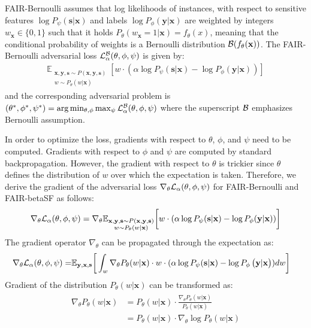 \documentclass[preprint,12pt]{elsarticle}
\begin{document}
FAIR-Bernoulli assumes that log likelihoods of instances, with respect to sensitive features $\log P_{\psi}(\mathbf{s}|\mathbf{x})$ and labels $\log P_{\phi}(\mathbf{y}|\mathbf{x})$ are weighted by integers $w_\mathbf{x} \in \{0,1\}$ such that it holds $P_\theta(w_\mathbf{x}=1|\mathbf{x})=f_\theta(x)$, meaning that the conditional probability of weights is a Bernoulli distribution ${\cal B}(f_\theta(\mathbf{x}))$. The FAIR-Bernoulli adversarial loss ${\cal L}^{\cal B}_{\alpha}(\theta, \phi, \psi)$ is given by:
\begin{gather}
\label{Eq:Loss_prob}
\mathbb{E}_{\substack{\mathbf{x},\mathbf{y}, \mathbf{s} \sim P\left(\mathbf{x},\mathbf{y}, \mathbf{s}\right)\\w \sim P_\theta(w|\mathbf{x})}}  \left[ w \cdot(\alpha\log P_{\psi}\left(\mathbf{s}|\mathbf{x}\right)
-  \log P_{\phi}\left(\mathbf{y}|\mathbf{x}\right))\right]
\end{gather}
and the corresponding adversarial problem is $(\theta^*,\phi^*,\psi^*) = \arg\min_{\theta,\phi}\max_{\psi}{\cal L}^{\cal B}_\alpha(\theta,\phi,\psi)$
where the superscript ${\cal B}$ emphasizes Bernoulli assumption.

In order to optimize the loss, gradients with respect to $\theta$, $\phi$, and $\psi$ need to be computed. Gradients with respect to $\phi$ and $\psi$ are computed by standard backpropagation. However, the gradient with respect to $\theta$ is trickier since $\theta$ defines the distribution of $w$ over which the expectation is taken. Therefore, we derive the gradient of the adversarial loss $\nabla_{\theta}{\cal L}_{\alpha}(\theta, \phi, \psi)$ for FAIR-Bernoulli and FAIR-betaSF as follows:
$$\nabla_{\theta}{\cal L}_{\alpha}(\theta, \phi, \psi) = \nabla_{\theta} \mathbb{E}_{\substack{\mathbf{x},\mathbf{y}, \mathbf{s} \sim P(\mathbf{x},\mathbf{y}, \mathbf{s})\\w \sim P_\theta(w|\mathbf{x})}} \bigg[ w \cdot ( \alpha \log P_{\psi}(\mathbf{s}|\mathbf{x}) - \log P_{\phi}(\mathbf{y}|\mathbf{x}))\bigg]$$
The gradient operator $\nabla_{\theta}$ can be propagated through the expectation as:
\begin{align*}
\begin{split}
\nabla_{\theta}{\cal L}_{\alpha}(\theta, \phi, \psi) =& \mathbb{E}_{\mathbf{y},\mathbf{x},\mathbf{s}} \bigg[ \int_w \nabla_{\theta}  P_\theta(w|\mathbf{x}) \cdot w \cdot ( \alpha \log P_{\psi}(\mathbf{s}|\mathbf{x}) - \log P_{\phi}\left(\mathbf{y}|\mathbf{x}\right))dw \bigg]
\end{split}
\end{align*}
Gradient of the distribution $P_\theta(w|\mathbf{x})$ can be transformed as:
\begin{align*}
\begin{split}
\nabla_{\theta}  P_\theta(w|\mathbf{x}) &= P_\theta(w|\mathbf{x}) \cdot \frac{\nabla_{\theta}P_\theta(w|\mathbf{x}) }{ P_\theta(w|\mathbf{x})}
\\
&= P_\theta(w|\mathbf{x}) \cdot \nabla_{\theta} \log P_\theta(w|\mathbf{x})
\end{split}
\end{align*}
\end{document}
